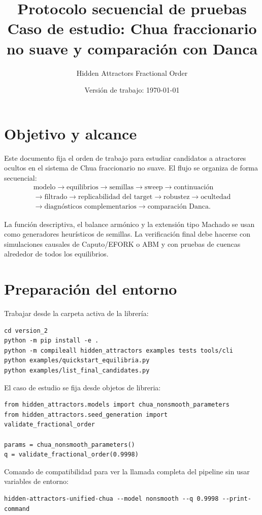 \documentclass[11pt]{article}
\title{Protocolo secuencial de pruebas\\
\large Caso de estudio: Chua fraccionario no suave y comparación con Danca}
\author{Hidden Attractors Fractional Order}
\date{Versión de trabajo: \today}
\begin{document}
\maketitle
\tableofcontents

\section{Objetivo y alcance}

Este documento fija el orden de trabajo para estudiar candidatos a atractores ocultos en el sistema de Chua fraccionario no suave. El flujo se organiza de forma secuencial:
\[
\begin{gathered}
\text{modelo}\to\text{equilibrios}\to\text{semillas}\to\text{sweep}\to\text{continuación}\\
\to\text{filtrado}\to\text{replicabilidad del target}\to\text{robustez}\to\text{ocultedad}\\
\to\text{diagnósticos complementarios}\to\text{comparación Danca}.
\end{gathered}
\]

La función descriptiva, el balance armónico y la extensión tipo Machado se usan como generadores heurísticos de semillas. La verificación final debe hacerse con simulaciones causales de Caputo/EFORK o ABM y con pruebas de cuencas alrededor de todos los equilibrios.

\section{Preparación del entorno}

Trabajar desde la carpeta activa de la librería:
\begin{lstlisting}
cd version_2
python -m pip install -e .
python -m compileall hidden_attractors examples tests tools/cli
python examples/quickstart_equilibria.py
python examples/list_final_candidates.py
\end{lstlisting}

El caso de estudio se fija desde objetos de libreria:
\begin{lstlisting}
from hidden_attractors.models import chua_nonsmooth_parameters
from hidden_attractors.seed_generation import validate_fractional_order

params = chua_nonsmooth_parameters()
q = validate_fractional_order(0.9998)
\end{lstlisting}

Comando de compatibilidad para ver la llamada completa del pipeline sin usar variables de entorno:
\begin{lstlisting}
hidden-attractors-unified-chua --model nonsmooth --q 0.9998 --print-command
\end{lstlisting}
\end{document}

